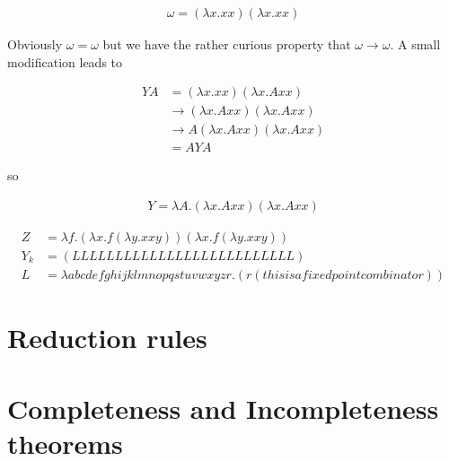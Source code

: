 \documentclass{article}
\begin{document}
\begin{align}
\omega = (\lambda x. xx) (\lambda x. xx)
\end{align}

Obviously $\omega = \omega$ but we have the rather curious property that $\omega \rightarrow \omega$. A small modification leads to

\begin{align}
YA &= (\lambda x. xx) (\lambda x. Axx)    \\
   &\rightarrow (\lambda x. Axx) (\lambda x. Axx)   \\
   &\rightarrow A (\lambda x. Axx) (\lambda x. Axx) \\
   &= AYA
\end{align}

so

\begin{align}
Y = \lambda A.(\lambda x. Axx) (\lambda x. Axx) 
\end{align}

\begin{align}
Z &= \lambda f. (\lambda x. f (\lambda y. x x y)) (\lambda x. f (\lambda y. x x y)) \\
Y_k &= (L L L L L L L L L L L L L L L L L L L L L L L L L L) \\
L &= \lambda abcdefghijklmnopqstuvwxyzr.(r(thisisafixedpointcombinator)) 
\end{align}

\section{Reduction rules}
\section{Completeness and Incompleteness theorems}
\end{document}
